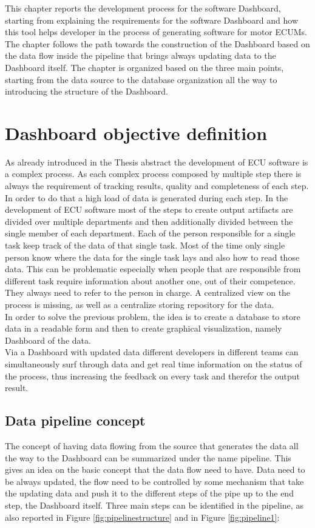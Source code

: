 \documentclass[../main.tex]{subfiles}
\begin{document}
This chapter reports the development process for the software Dashboard, starting from explaining the requirements for the software Dashboard and how this tool helps developer in the process of generating software for motor \gls{ECUM}s. The chapter follows the path towards the construction of the Dashboard based on the data flow inside the pipeline that brings always updating data to the Dashboard itself. The chapter is organized based on the three main points, starting from the data source to the database organization all the way to introducing the structure of the Dashboard.
\section{Dashboard objective definition}
As already introduced in the Thesis abstract the development of \gls{ECU} software is a complex process. As each complex process composed by multiple step there is always the requirement of tracking results, quality and completeness of each step. In order to do that a high load of data is generated during each step.
In the development of \gls{ECU} software most of the steps to create output artifacts are divided over multiple departments and then additionally divided between the single member of each department. Each of the person responsible for a single task keep track of the data of that single task. Most of the time only single person know where the data for the single task lays and also how to read those data. This can be problematic especially when people that are responsible from different task require information about another one, out of their competence. They always need to refer to the person in charge. A centralized view on the process is missing, as well as a centralize storing repository for the data. \\
In order to solve the previous problem, the idea is to create a database to store data in a readable form and then to create graphical visualization, namely Dashboard of the data.\\
Via a Dashboard with updated data different developers in different teams can simultaneously surf through data and get real time information on the status of the process, thus increasing the feedback on every task and therefor the output result.
\subsection{Data pipeline concept}
The concept of having data flowing from the source that generates the data all the way to the Dashboard can be summarized under the name pipeline. This gives an idea on the basic concept that the data flow need to have. Data need to be always updated, the flow need to be controlled by some mechanism that take the updating data and push it to the different steps of the pipe up to the end step, the Dashboard itself. Three main steps can be identified in the pipeline, as also reported in Figure \ref{fig:pipelinestructure} and in Figure \ref{fig:pipeline1}:
\end{document}
